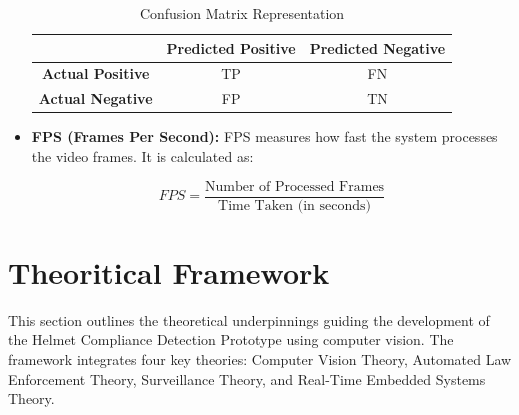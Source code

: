 \begin{refsection}
\begin{itemize}
    \begin{table}[ht]
    \centering
    \caption{Confusion Matrix Representation}
    \label{tbl:confusionMatrix}
    \begin{tabular}{|c|c|c|}
        \hline
        & \textbf{Predicted Positive} & \textbf{Predicted Negative} \\ \hline
        \textbf{Actual Positive} & TP & FN \\ \hline
        \textbf{Actual Negative} & FP & TN \\ \hline
    \end{tabular}
    \end{table}


    \item \textbf{FPS (Frames Per Second):} FPS measures how fast the system processes the video frames. It is calculated as:


    \begin{equation}
        FPS = \frac{\text{Number of Processed Frames}}{\text{Time Taken (in seconds)}}
        \label{eq:fps}
    \end{equation}
\end{itemize}




\section*{Theoritical Framework}


This section outlines the theoretical underpinnings guiding the development of the Helmet Compliance Detection Prototype using computer vision. The framework integrates four key theories: Computer Vision Theory, Automated Law Enforcement Theory, Surveillance Theory, and Real-Time Embedded Systems Theory.



\end{refsection}
